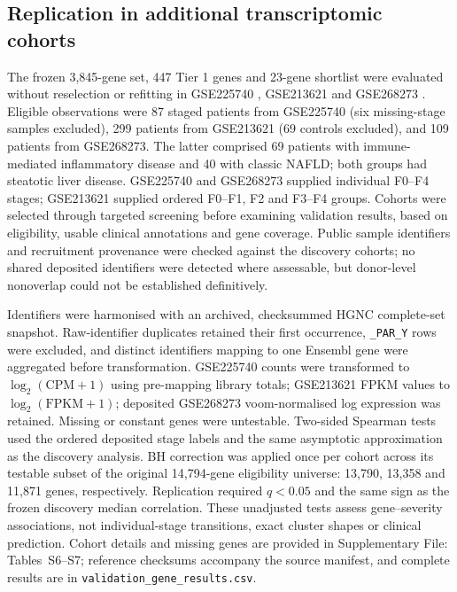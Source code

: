 \documentclass[11pt,a4paper]{article}
\begin{document}
\subsection*{Replication in additional transcriptomic cohorts}
The frozen 3,845-gene set, 447 Tier 1 genes and 23-gene shortlist were evaluated without reselection or refitting in GSE225740 \cite{powell2023}, GSE213621 \cite{chen2023} and GSE268273 \cite{garcianieto2024}. Eligible observations were 87 staged patients from GSE225740 (six missing-stage samples excluded), 299 patients from GSE213621 (69 controls excluded), and 109 patients from GSE268273. The latter comprised 69 patients with immune-mediated inflammatory disease and 40 with classic NAFLD; both groups had steatotic liver disease. GSE225740 and GSE268273 supplied individual F0--F4 stages; GSE213621 supplied ordered F0--F1, F2 and F3--F4 groups. Cohorts were selected through targeted screening before examining validation results, based on eligibility, usable clinical annotations and gene coverage. Public sample identifiers and recruitment provenance were checked against the discovery cohorts; no shared deposited identifiers were detected where assessable, but donor-level nonoverlap could not be established definitively.

Identifiers were harmonised with an archived, checksummed HGNC complete-set snapshot. Raw-identifier duplicates retained their first occurrence, \texttt{\_PAR\_Y} rows were excluded, and distinct identifiers mapping to one Ensembl gene were aggregated before transformation. GSE225740 counts were transformed to $\log_2(\mathrm{CPM}+1)$ using pre-mapping library totals; GSE213621 FPKM values to $\log_2(\mathrm{FPKM}+1)$; deposited GSE268273 voom-normalised log expression was retained. Missing or constant genes were untestable. Two-sided Spearman tests used the ordered deposited stage labels and the same asymptotic approximation as the discovery analysis. BH correction was applied once per cohort across its testable subset of the original 14,794-gene eligibility universe: 13,790, 13,358 and 11,871 genes, respectively. Replication required $q<0.05$ and the same sign as the frozen discovery median correlation. These unadjusted tests assess gene--severity associations, not individual-stage transitions, exact cluster shapes or clinical prediction. Cohort details and missing genes are provided in Supplementary File: Tables~S6--S7; reference checksums accompany the source manifest, and complete results are in \nolinkurl{validation_gene_results.csv}.
\end{document}
